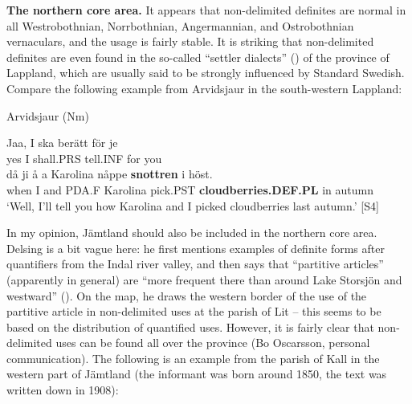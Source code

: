 
\textbf{The northern core area. }It appears that non-delimited definites are normal in all Westrobothnian, Norrbothnian, Angermannian, and Ostrobothnian vernaculars, and the usage is fairly stable. It is striking that non-delimited definites are even found in the so-called “settler dialects” () of the province of Lappland, which are usually said to be strongly influenced by Standard Swedish. Compare the following example from Arvidsjaur in the south-western Lappland:


\item 

Arvidsjaur (Nm)



 \ea\label{}
\gll Jaa,  I  ska  berätt  för  je\\


yes  I  shall.PRS  tell.INF  for  you\\

 \ea\label{}
\gll då  ji  å  a  Karolina  nåppe  \textbf{snottren} i  höst.\\


when  I  and  PDA.F  Karolina  pick.PST  \textbf{cloudberries.DEF.PL} in  autumn\\

\glt ‘Well, I’ll tell you how Karolina and I picked cloudberries last autumn.’\textsuperscript{ }[S4]

\z

In my opinion, Jämtland should also be included in the northern core area. Delsing is a bit vague here: he first mentions examples of definite forms after quantifiers from the Indal river valley, and then says that “partitive articles” (apparently in general) are “more frequent there than around Lake Storsjön and westward” (\citet[19]{Delsing2003a}). On the map, he draws the western border of the use of the partitive article in non-delimited uses at the parish of Lit – this seems to be based on the distribution of quantified uses. However, it is fairly clear that non-delimited uses can be found all over the province (Bo Oscarsson, personal communication). The following is an example from the parish of Kall in the western part of Jämtland (the informant was born around 1850, the text was written down in 1908):

